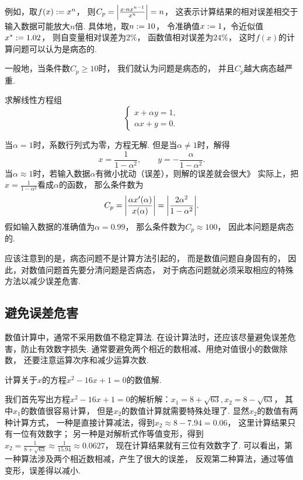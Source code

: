 例如，取\(f(x) := x^n\)，
则\(C_p = \abs{\frac{x \cdot n x^{n-1}}{x^n}} = n\)，
这表示计算结果的相对误差相交于输入数据可能放大\(n\)倍.
具体地，取\(n := 10\)，
令准确值\(x := 1\)，令近似值\(x^* := 1.02\)，
则自变量相对误差为\(2\%\)，
函数值相对误差为\(24\%\)，
这时\(f(x)\)的计算问题可以认为是病态的.

一般地，当条件数\(C_p \geq 10\)时，
我们就认为问题是病态的，
并且\(C_p\)越大病态越严重.

\begin{example}

求解线性方程组\begin{equation*}
	\begin{cases}
		x + \alpha y = 1, \\
		\alpha x + y = 0.
	\end{cases}
\end{equation*}
\begin{solution}
当\(\alpha = 1\)时，系数行列式为零，方程无解.
但是当\(\alpha \neq 1\)时，解得\begin{equation*}
	x = \frac{1}{1-\alpha^2},
	\qquad
	y = -\frac{\alpha}{1-\alpha^2}.
\end{equation*}
当\(\alpha \approx 1\)时，若输入数据\(\alpha\)有微小扰动（误差），则解的误差就会很大》
实际上，把\(x = \frac{1}{1-\alpha^2}\)看成\(\alpha\)的函数，
那么条件数为\begin{equation*}
	C_p = \abs{\frac{\alpha x'(\alpha)}{x(\alpha)}}
	= \abs{\frac{2\alpha^2}{1-\alpha^2}}.
\end{equation*}
假如输入数据的准确值为\(\alpha = 0.99\)，
那么条件数为\(C_p \approx 100\)，
因此本问题是病态的.
\end{solution}
\end{example}

应该注意到的是，病态问题不是计算方法引起的，
而是数值问题自身固有的，
因此，对数值问题首先要分清问题是否病态，
对于病态问题就必须采取相应的特殊方法以减少误差危害.

\subsection{避免误差危害}
数值计算中，通常不采用数值不稳定算法.
在设计算法时，还应该尽量避免误差危害，防止有效数字损失.
通常要避免两个相近的数相减、用绝对值很小的数做除数，
还要注意运算次序和减少运算次数.

\begin{example}
计算关于\(x\)的方程\(x^2-16x+1=0\)的数值解.
\begin{solution}
我们首先写出方程\(x^2-16x+1=0\)的解析解：\(
	x_1 = 8 + \sqrt{63},
	x_2 = 8 - \sqrt{63}
\)，
其中\(x_1\)的数值很容易计算，
但是\(x_2\)的数值计算就需要特殊处理了.
显然\(x_2\)的数值有两种计算方式，
一种是直接计算减法，得到\(x_2 \approx 8 - 7.94 = 0.06\)，
这里计算结果只有一位有效数字；
另一种是对解析式作等值变形，得到\(x_2 = \frac{1}{8 + \sqrt{63}} \approx \frac{1}{15.94} \approx 0.0627\)，
现在计算结果就有三位有效数字了.
可以看出，第一种算法涉及两个相近数相减，产生了很大的误差，
反观第二种算法，通过等值变形，误差得以减小.
\end{solution}
\end{example}

